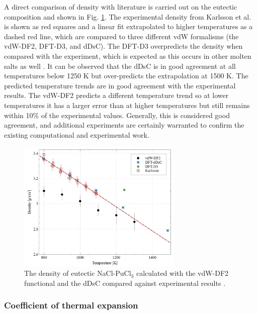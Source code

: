\documentclass[review]{elsarticle}
\begin{document}
A direct comparison of density with literature is carried out on the eutectic composition and shown in Fig. \ref{fig:eutectic_density}. The experimental density from Karlsson et al. \cite{karlsson2022synthesis} is shown as red squares and a linear fit extrapolated to higher temperatures as a dashed red line, which are compared to three different vdW formalisms (the vdW-DF2, DFT-D3, and dDsC). The DFT-D3 overpredicts the density when compared with the experiment, which is expected as this occurs in other molten salts as well \cite{duemmler_liclkcl, duemmler_naclmgcl}. It can be observed that the dDsC is in good agreement at all temperatures below 1250 K but over-predicts the extrapolation at 1500 K.  The predicted temperature trends are in good agreement with the experimental results. The vdW-DF2 predicts a different temperature trend so at lower temperatures it has a larger error than at higher temperatures but still remains within 10\% of the experimental values. Generally, this is considered good agreement, and additional experiments are certainly warranted to confirm the existing computational and experimental work.

\begin{figure}[h!]
\centering
\includegraphics[width=0.7\textwidth]{density_comp.jpg}
\caption{The density of eutectic NaCl-PuCl$_3$ calculated with the vdW-DF2 functional and the dDsC compared against experimental results \cite{karlsson2022synthesis}.}
\label{fig:eutectic_density}
\end{figure}

\subsubsection{Coefficient of thermal expansion}
\end{document}
